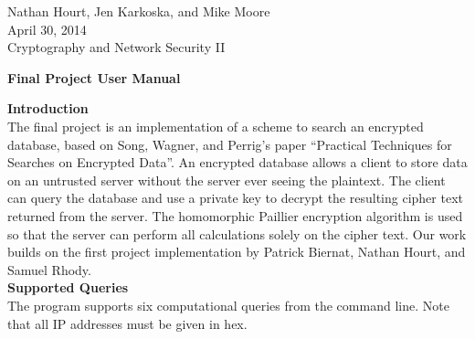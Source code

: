 \documentclass[12pt]{article}
\begin{document}
{Nathan Hourt, Jen Karkoska, and Mike Moore\\ \indent April 30, 2014\\ \indent Cryptography and Network Security II}\vspace{\baselineskip}
\begin{center}
\textbf{Final Project User Manual}
\end{center}

\textbf{Introduction}\\

The final project is an implementation of a scheme to search an encrypted database, based on Song, Wagner, and Perrig's paper ``Practical Techniques for Searches on Encrypted Data''.  An encrypted database allows a client to store data on an untrusted server without the server ever seeing the plaintext.  The client can query the database and use a private key to decrypt the resulting cipher text returned from the server.  The homomorphic Paillier encryption algorithm is used so that the server can perform all calculations solely on the cipher text.  Our work builds on the first project implementation by Patrick Biernat, Nathan Hourt, and Samuel Rhody.\\

\textbf{Supported Queries}\\

The program supports six computational queries from the command line. Note that all IP addresses must be given in hex.
\end{document}
